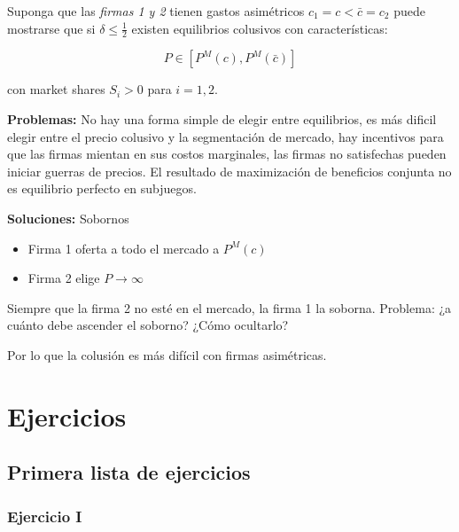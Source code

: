 \documentclass[letterpaper,12pt,twocolumn]{report}
\begin{document}
Suponga que las \textit{firmas 1 y 2} tienen gastos asimétricos $c_1=c<\bar{c}= c_2$ puede mostrarse que si $\delta \leq \frac{1}{2}$ existen equilibrios colusivos con características:

$$ P \in [P^M(c),P^M(\bar{c})] $$

con market shares $S_i>0$ para $i=1,2$.

\textbf{Problemas:} No hay una forma simple de elegir entre equilibrios, es más dificil elegir entre el precio colusivo y la segmentación de mercado, hay incentivos para que las firmas mientan en sus costos marginales, las firmas no satisfechas pueden iniciar guerras de precios. El resultado de maximización de beneficios conjunta no es equilibrio perfecto en subjuegos. 

\textbf{Soluciones:} Sobornos

\begin{itemize}
	\item Firma 1 oferta a todo el mercado a $ P^M(c) $
	\item Firma 2 elige $P \rightarrow \infty$
\end{itemize}

Siempre que la firma 2 no esté en el mercado, la firma 1 la soborna. Problema: ¿a cuánto debe ascender el soborno? ¿Cómo ocultarlo?

Por lo que la colusión es más difícil con firmas asimétricas.

\chapter{Ejercicios}

\section{Primera lista de ejercicios}

\subsection*{Ejercicio I}
\end{document}

